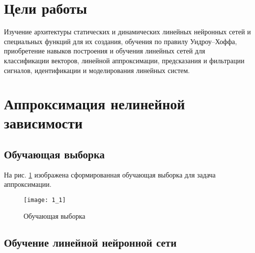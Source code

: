 





\tableofcontents
\newpage
\listoffigures
\newpage

\section{Цели работы}

Изучение архитектуры статических и динамических линейных нейронных сетей и специальных функций для их создания, обучения по правилу Уидроу–Хоффа, приобретение навыков построения и обучения линейных сетей для классификации векторов, линейной аппроксимации, предсказания и фильтрации сигналов, идентификации и моделирования линейных систем.

\section{Аппроксимация нелинейной зависимости}

\subsection{Обучающая выборка}


На рис. \ref{fig:1_1} изображена сформированная обучающая выборка для задача аппроксимации.

\begin{figure}[H]
\begin{center}
	\texttt{[image: 1\_1]}
	\caption{Обучающая выборка}
	\label{fig:1_1}
\end{center}
\end{figure}

\subsection{Обучение линейной нейронной сети}


